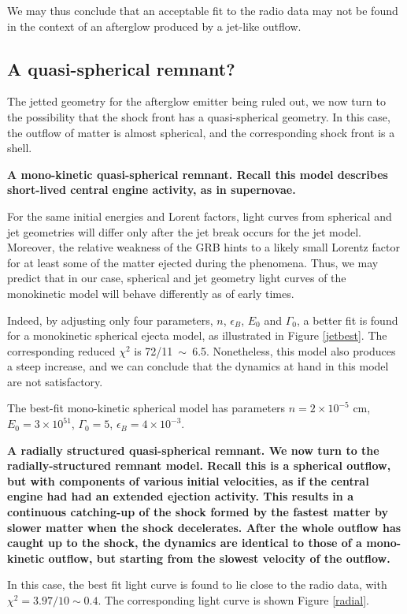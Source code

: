 We may thus conclude that an acceptable fit to the radio data may not be found in the context of an afterglow produced by a jet-like outflow.


\subsection{A quasi-spherical remnant?}
\label{QSR}
The jetted geometry for the afterglow emitter being ruled out, we now turn to the possibility that the shock front has a quasi-spherical geometry. In this case, the outflow of matter is almost spherical, and the corresponding shock front is a shell.

\bf{A mono-kinetic quasi-spherical remnant. }Recall this model describes short-lived central engine activity, as in supernovae.

For the same initial energies and Lorent factors, light curves from spherical and jet geometries will differ only after the jet break occurs for the jet model. Moreover, the relative weakness of the GRB hints to a likely small Lorentz factor for at least some of the matter ejected during the phenomena. Thus, we may predict that in our case, spherical and jet geometry light curves of the monokinetic model will behave differently as of early times.

Indeed, by adjusting only four parameters, $n$, $\epsilon_B$, $E_0$ and $\Gamma_0$, a better fit is found for a monokinetic spherical ejecta model, as illustrated in Figure \ref{jetbest}. The corresponding reduced $\chi^2$ is 72/11~$\sim$~6.5. Nonetheless, this model also produces a steep increase, and we can conclude that the dynamics at hand in this model are not satisfactory.

The best-fit mono-kinetic spherical model has parameters $n = 2 \times 10^{-5}$ cm, $E_0 = 3 \times 10^51$, $\Gamma_0 = 5$, $\epsilon_B = 4 \times 10^{-3}$.

\bf{A radially structured quasi-spherical remnant. }We now turn to the radially-structured remnant model. Recall this is a spherical outflow, but with components of various initial velocities, as if the central engine had had an extended ejection activity. This results in a continuous catching-up of the shock formed by the fastest matter by slower matter when the shock decelerates. After the whole outflow has caught up to the shock, the dynamics are identical to those of a mono-kinetic outflow, but starting from the slowest velocity of the outflow.

In this case, the best fit light curve is found to lie close to the radio data, with $\chi^2 = 3.97/10 \sim 0.4$. The corresponding light curve is shown Figure \ref{radial}.

